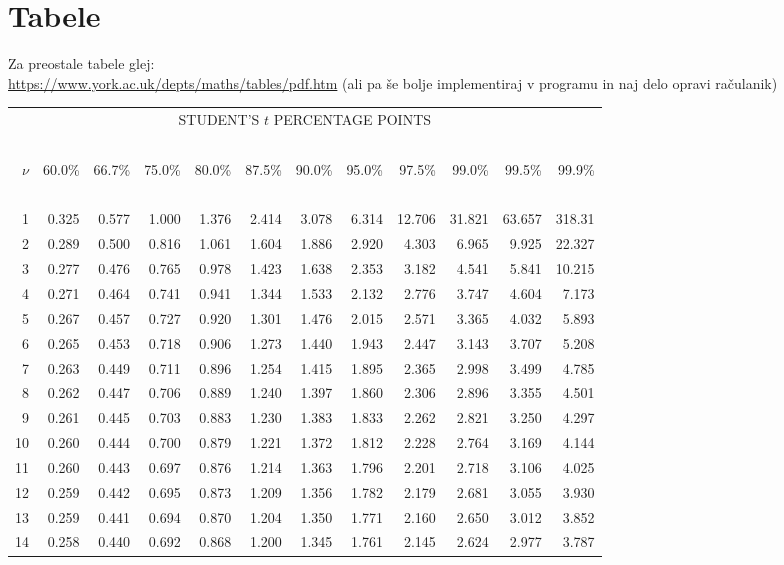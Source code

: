 \chapter{Tabele}

\thispagestyle{empty}

Za preostale tabele glej: \\
\url{https://www.york.ac.uk/depts/maths/tables/pdf.htm} (ali pa še bolje implementiraj v programu in naj delo opravi račulanik)

\begin{center}
\begin{tabular}
      {r@{\quad}r@{\,}r@{\,}r@{\,}r@{\,}r@{\,}r@{\,}r@{\,}r@{\,}r@{\,}r@{\,}r}
\multicolumn{12}{c}{STUDENT'S $t$ PERCENTAGE POINTS} \\
\ \\
$\nu$&60.0\%&66.7\%&75.0\%&80.0\%&87.5\%&90.0\%&95.0\%&97.5\%&99.0\%&99.5\%
     &99.9\% \\
\ \\
 1&0.325&0.577&1.000&1.376&2.414&3.078&6.314&12.706&31.821&63.657&318.31 \\
 2&0.289&0.500&0.816&1.061&1.604&1.886&2.920&4.303&6.965&9.925&22.327 \\
 3&0.277&0.476&0.765&0.978&1.423&1.638&2.353&3.182&4.541&5.841&10.215 \\
 4&0.271&0.464&0.741&0.941&1.344&1.533&2.132&2.776&3.747&4.604&7.173 \\
 5&0.267&0.457&0.727&0.920&1.301&1.476&2.015&2.571&3.365&4.032&5.893 \\
 6&0.265&0.453&0.718&0.906&1.273&1.440&1.943&2.447&3.143&3.707&5.208 \\
 7&0.263&0.449&0.711&0.896&1.254&1.415&1.895&2.365&2.998&3.499&4.785 \\
 8&0.262&0.447&0.706&0.889&1.240&1.397&1.860&2.306&2.896&3.355&4.501 \\
 9&0.261&0.445&0.703&0.883&1.230&1.383&1.833&2.262&2.821&3.250&4.297 \\
10&0.260&0.444&0.700&0.879&1.221&1.372&1.812&2.228&2.764&3.169&4.144 \\
11&0.260&0.443&0.697&0.876&1.214&1.363&1.796&2.201&2.718&3.106&4.025 \\
12&0.259&0.442&0.695&0.873&1.209&1.356&1.782&2.179&2.681&3.055&3.930 \\
13&0.259&0.441&0.694&0.870&1.204&1.350&1.771&2.160&2.650&3.012&3.852 \\
14&0.258&0.440&0.692&0.868&1.200&1.345&1.761&2.145&2.624&2.977&3.787 \\

\end{tabular}
\end{center}
